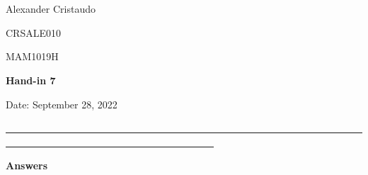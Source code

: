 \documentclass[12pt, a4paper]{exam}
\begin{document}
	\noindent
	\begin{minipage}[l]{0.1\textwidth}
		\noindent
	\end{minipage}
\hfill
\begin{minipage}[c]{1.0\textwidth} %
	\begin{center}
		
		{
		\large \ \ \par
		\large \ \ \par
		\large  Alexander Cristaudo \par
		\small	CRSALE010	\par
		\large	MAM1019H	\par
	\large \textbf{Hand-in 7}	\par
\small	Date: September 28, 2022}
	\end{center}
\end{minipage}
\par
\vspace{0.2in}
\noindent
\uline{ \ \ \ \ \ \ \ \ \ \ \ \ \ \ \ \ \ \ \ \ \ \ \ \ \ \ \ \ \ \ \ \ \ \ \ \ \ \ \ \ \ \ \ \ \ \ \ \ \ \ \ \ \ \ \ \ \ \ \ \ \ \ \ \ \ \ \ \ \ \ \ \ \ \ \ \ \ \  \ \ \ \ \ \ \ \ \ \ \ \ \ \  \ \ \ \ \ \ \ \ \ \ \ \ \ \ \ \ \ \ \ \ \ \ }
\par 
\vspace{0.15in}
\noindent
\centering
{\small \bfseries 	Answers}
\end{document}
